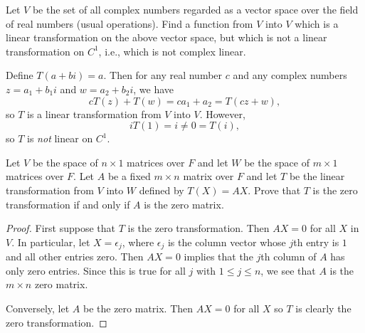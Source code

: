  Let $V$ be the set of all complex numbers regarded as a
vector space over the field of real numbers (usual operations). Find a
function from $V$ into $V$ which is a linear transformation on the
above vector space, but which is not a linear transformation on $C^1$,
i.e., which is not complex linear.
\begin{solution}
  Define $T(a + bi) = a$. Then for any real number $c$ and any
  complex numbers $z = a_1 + b_1i$ and $w = a_2 + b_2i$, we have
  \begin{equation*}
    cT(z) + T(w) = ca_1 + a_2 = T(cz + w),
  \end{equation*}
  so $T$ is a linear transformation from $V$ into $V$. However,
  \begin{equation*}
    iT(1) = i \neq 0 = T(i),
  \end{equation*}
  so $T$ is {\em not} linear on $C^1$.
\end{solution}

 Let $V$ be the space of $n\times1$ matrices over $F$ and
let $W$ be the space of $m\times1$ matrices over $F$. Let $A$ be a
fixed $m\times n$ matrix over $F$ and let $T$ be the linear
transformation from $V$ into $W$ defined by $T(X) = AX$. Prove that
$T$ is the zero transformation if and only if $A$ is the zero matrix.
\begin{proof}
  First suppose that $T$ is the zero transformation. Then $AX = 0$ for
  all $X$ in $V$. In particular, let $X = \epsilon_j$, where
  $\epsilon_j$ is the column vector whose $j$th entry is $1$ and all
  other entries zero. Then $AX = 0$ implies that the $j$th column of
  $A$ has only zero entries. Since this is true for all $j$ with
  $1\leq j\leq n$, we see that $A$ is the $m\times n$ zero matrix.

  Conversely, let $A$ be the zero matrix. Then $AX = 0$ for all $X$ so
  $T$ is clearly the zero transformation.
\end{proof}

